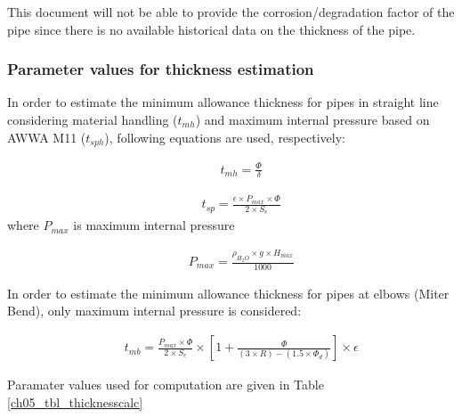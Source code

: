 This document will not be able to provide the corrosion/degradation factor of the pipe since there is no available historical data on the thickness of the pipe.

\subsubsection{Parameter values for thickness estimation}
In order to estimate the minimum allowance thickness for pipes in straight line considering material handling ($t_{mh}$) and maximum internal pressure based on AWWA M11 ($t_{sph}$), following equations are used, respectively:

\begin{eqnarray}
&& t_{mh} = \frac{\Phi}{\delta} \label{ch05thickness01}
\end{eqnarray}

\begin{eqnarray}
&& t_{sp} = \frac{\epsilon\times P_{max} \times \Phi}{2 \times S_e} \label{ch05thickness02}
\end{eqnarray}
where $P_{max}$ is maximum internal pressure

\begin{eqnarray}
&& P_{max} = \frac{\rho_{H_2O} \times g \times H_{max}}{1000} \label{ch05thickness03}
\end{eqnarray}

In order to estimate the minimum allowance thickness for pipes at elbows (Miter Bend), only maximum internal pressure is considered:

\begin{eqnarray}
&& t_{mb} = \frac{P_{max} \times \Phi}{2 \times S_e} \times \left[ 1 + \frac{\Phi}{(3 \times R)-(1.5 \times \Phi_d)}\right]\times \epsilon \label{ch05thickness04}
\end{eqnarray}

Paramater values used for computation are given in Table \ref{ch05_tbl_thicknesscalc}

